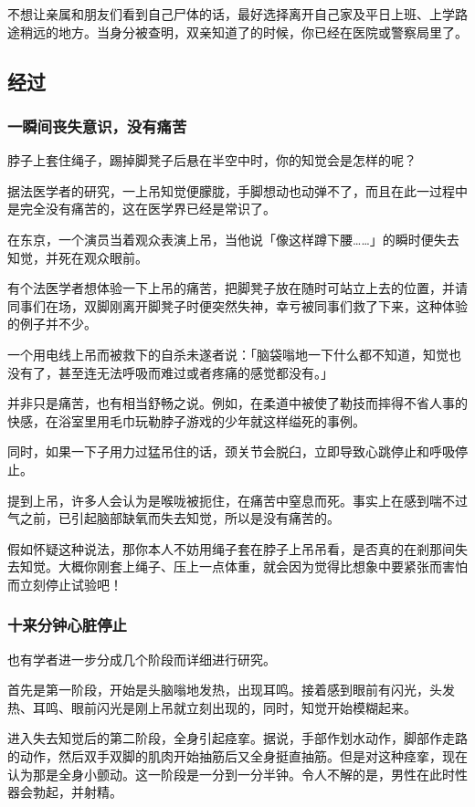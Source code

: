 \documentclass[UTF8]{ctexart}
\begin{document}
不想让亲属和朋友们看到自己尸体的话，最好选择离开自己家及平日上班、上学路途稍远的地方。当身分被查明，双亲知道了的时候，你已经在医院或警察局里了。

\subsection{经过}

\subsubsection*{一瞬间丧失意识，没有痛苦}

脖子上套住绳子，踢掉脚凳子后悬在半空中时，你的知觉会是怎样的呢？

据法医学者的研究，一上吊知觉便朦胧，手脚想动也动弹不了，而且在此一过程中是完全没有痛苦的，这在医学界已经是常识了。

在东京，一个演员当着观众表演上吊，当他说「像这样蹲下腰……」的瞬时便失去知觉，并死在观众眼前。

有个法医学者想体验一下上吊的痛苦，把脚凳子放在随时可站立上去的位置，并请同事们在场，双脚刚离开脚凳子时便突然失神，幸亏被同事们救了下来，这种体验的例子并不少。

一个用电线上吊而被救下的自杀未遂者说：「脑袋嗡地一下什么都不知道，知觉也没有了，甚至连无法呼吸而难过或者疼痛的感觉都没有。」

并非只是痛苦，也有相当舒畅之说。例如，在柔道中被使了勒技而摔得不省人事的快感，在浴室里用毛巾玩勒脖子游戏的少年就这样缢死的事例。

同时，如果一下子用力过猛吊住的话，颈关节会脱臼，立即导致心跳停止和呼吸停止。

提到上吊，许多人会认为是喉咙被扼住，在痛苦中窒息而死。事实上在感到喘不过气之前，已引起脑部缺氧而失去知觉，所以是没有痛苦的。

假如怀疑这种说法，那你本人不妨用绳子套在脖子上吊吊看，是否真的在剎那间失去知觉。大概你刚套上绳子、压上一点体重，就会因为觉得比想象中要紧张而害怕而立刻停止试验吧！ 

\subsubsection*{十来分钟心脏停止}

也有学者进一步分成几个阶段而详细进行研究。

首先是第一阶段，开始是头脑嗡地发热，出现耳鸣。接着感到眼前有闪光，头发热、耳鸣、眼前闪光是刚上吊就立刻出现的，同时，知觉开始模糊起来。

进入失去知觉后的第二阶段，全身引起痉挛。据说，手部作划水动作，脚部作走路的动作，然后双手双脚的肌肉开始抽筋后又全身挺直抽筋。但是对这种痉挛，现在认为那是全身小颤动。这一阶段是一分到一分半钟。令人不解的是，男性在此时性器会勃起，并射精。
\end{document}
